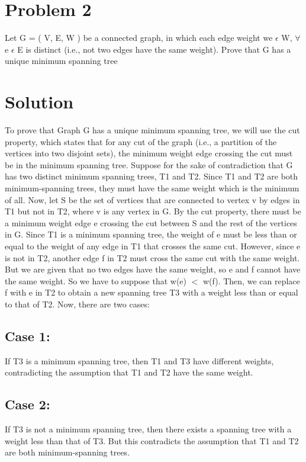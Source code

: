 \documentclass{article}
\begin{document}
\section*{\huge Problem 2}


\large Let G = ( V, E, W ) be a connected graph, in which each edge weight we $\epsilon{}$ W, $\forall{}$ e $\epsilon{}$ E is distinct (i.e., not two edges have the same weight). Prove that G has a unique minimum spanning tree

\section{\huge Solution}
\large To prove that Graph G has a unique minimum spanning tree, we will use the cut property, which states that for any cut of the graph (i.e., a partition of the vertices into two disjoint sets), the minimum weight edge crossing the cut must be in the minimum spanning tree. Suppose for the sake of contradiction that G has two distinct minimum spanning trees, T1 and T2. Since T1 and T2 are both minimum-spanning trees, they must have the same weight which is the minimum of all. Now, let S be the set of vertices that are connected to vertex v by edges in T1 but not in T2, where v is any vertex in G. By the cut property, there must be a minimum weight edge e crossing the cut between S and the rest of the vertices in G. Since T1 is a minimum spanning tree, the weight of e must be less than or equal to the weight of any edge in T1 that crosses the same cut. However, since e is not in T2, another edge f in T2 must cross the same cut with the same weight. But we are given that no two edges have the same weight, so e and f cannot have the same weight. So we have to suppose that w(e) $<$ w(f). Then, we can replace f with e in T2 to obtain a new spanning tree T3 with a weight less than or equal to that of T2. Now, there are two cases:

\subsection*{Case 1:}
If T3 is a minimum spanning tree, then T1 and T3 have different weights, contradicting the assumption that T1 and T2 have the same weight.
\subsection*{Case 2:}
If T3 is not a minimum spanning tree, then there exists a spanning tree with a weight less than that of T3. But this contradicts the assumption that T1 and T2 are both minimum-spanning trees.
\end{document}
